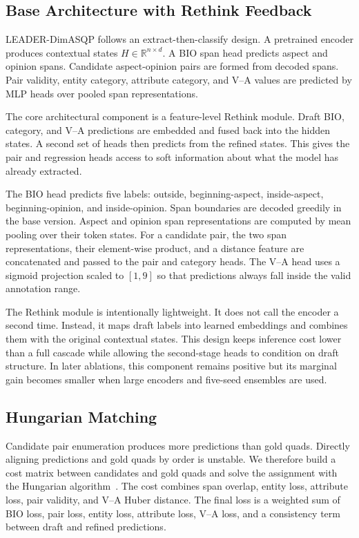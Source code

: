 \documentclass[runningheads]{llncs}
\begin{document}
\subsection{Base Architecture with Rethink Feedback}

LEADER-DimASQP follows an extract-then-classify design. A pretrained
encoder produces contextual states $H\in\mathbb{R}^{n\times d}$. A
BIO span head predicts aspect and opinion spans. Candidate
aspect-opinion pairs are formed from decoded spans. Pair validity,
entity category, attribute category, and V--A values are predicted by
MLP heads over pooled span representations.

The core architectural component is a feature-level Rethink module. Draft
BIO, category, and V--A predictions are embedded and fused back into
the hidden states. A second set of heads then predicts from the refined
states. This gives the pair and regression heads access to soft
information about what the model has already extracted.

The BIO head predicts five labels: outside, beginning-aspect,
inside-aspect, beginning-opinion, and inside-opinion. Span boundaries
are decoded greedily in the base version. Aspect and opinion span
representations are computed by mean pooling over their token states.
For a candidate pair, the two span representations, their element-wise
product, and a distance feature are concatenated and passed to the
pair and category heads. The V--A head uses a sigmoid projection scaled
to $[1,9]$ so that predictions always fall inside the valid annotation
range.

The Rethink module is intentionally lightweight. It does not call the
encoder a second time. Instead, it maps draft labels into learned
embeddings and combines them with the original contextual states. This
design keeps inference cost lower than a full cascade while allowing
the second-stage heads to condition on draft structure. In later
ablations, this component remains positive but its marginal gain becomes
smaller when large encoders and five-seed ensembles are used.

\subsection{Hungarian Matching}

Candidate pair enumeration produces more predictions than gold quads.
Directly aligning predictions and gold quads by order is unstable.
We therefore build a cost matrix between candidates and gold quads and
solve the assignment with the Hungarian algorithm~\cite{kuhn1955hungarian}. The cost combines
span overlap, entity loss, attribute loss, pair validity, and V--A
Huber distance. The final loss is a weighted sum of BIO loss, pair
loss, entity loss, attribute loss, V--A loss, and a consistency term
between draft and refined predictions.
\end{document}
